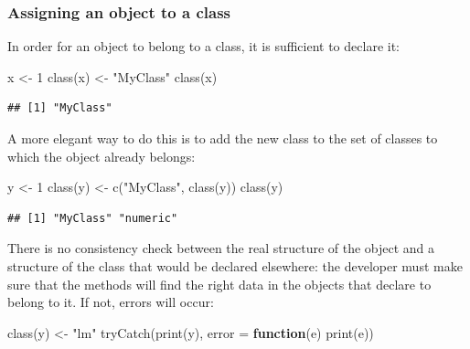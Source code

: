 \documentclass[
  12pt,
  american,
  a4paper,
  extrafontsizes,onecolumn,openright
  ]{memoir}
\newenvironment{Shaded}{\begin{snugshade}}{\end{snugshade}}
\newcommand{\AttributeTok}[1]{\textcolor[rgb]{0.77,0.63,0.00}{#1}}
\newcommand{\ControlFlowTok}[1]{\textcolor[rgb]{0.13,0.29,0.53}{\textbf{#1}}}
\newcommand{\DecValTok}[1]{\textcolor[rgb]{0.00,0.00,0.81}{#1}}
\newcommand{\FunctionTok}[1]{\textcolor[rgb]{0.00,0.00,0.00}{#1}}
\newcommand{\NormalTok}[1]{#1}
\newcommand{\OtherTok}[1]{\textcolor[rgb]{0.56,0.35,0.01}{#1}}
\newcommand{\StringTok}[1]{\textcolor[rgb]{0.31,0.60,0.02}{#1}}
\begin{document}
\hypertarget{assigning-an-object-to-a-class}{%
\subsubsection{Assigning an object to a class}\label{assigning-an-object-to-a-class}}

In order for an object to belong to a class, it is sufficient to declare it:

\scriptsize

\begin{Shaded}
\begin{Highlighting}[]
\NormalTok{x }\OtherTok{\textless{}{-}} \DecValTok{1}
\FunctionTok{class}\NormalTok{(x) }\OtherTok{\textless{}{-}} \StringTok{"MyClass"}
\FunctionTok{class}\NormalTok{(x)}
\end{Highlighting}
\end{Shaded}

\begin{verbatim}
## [1] "MyClass"
\end{verbatim}

\normalsize

A more elegant way to do this is to add the new class to the set of classes to which the object already belongs:

\scriptsize

\begin{Shaded}
\begin{Highlighting}[]
\NormalTok{y }\OtherTok{\textless{}{-}} \DecValTok{1}
\FunctionTok{class}\NormalTok{(y) }\OtherTok{\textless{}{-}} \FunctionTok{c}\NormalTok{(}\StringTok{"MyClass"}\NormalTok{, }\FunctionTok{class}\NormalTok{(y))}
\FunctionTok{class}\NormalTok{(y)}
\end{Highlighting}
\end{Shaded}

\begin{verbatim}
## [1] "MyClass" "numeric"
\end{verbatim}

\normalsize

There is no consistency check between the real structure of the object and a structure of the class that would be declared elsewhere: the developer must make sure that the methods will find the right data in the objects that declare to belong to it.
If not, errors will occur:

\scriptsize

\begin{Shaded}
\begin{Highlighting}[]
\FunctionTok{class}\NormalTok{(y) }\OtherTok{\textless{}{-}} \StringTok{"lm"}
\FunctionTok{tryCatch}\NormalTok{(}\FunctionTok{print}\NormalTok{(y), }\AttributeTok{error =} \ControlFlowTok{function}\NormalTok{(e) }\FunctionTok{print}\NormalTok{(e))}
\end{Highlighting}
\end{Shaded}
\end{document}
